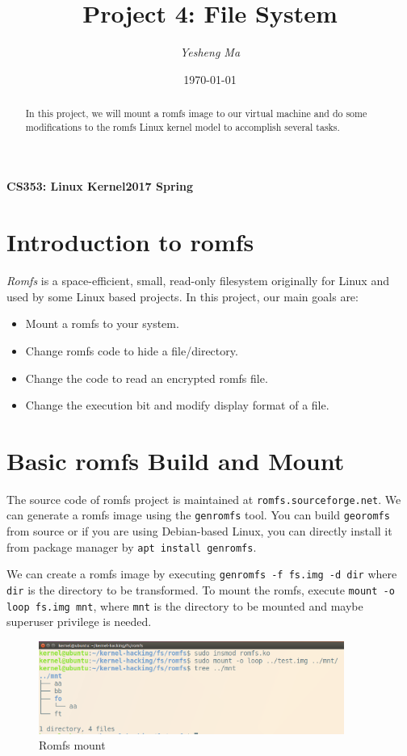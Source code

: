 \documentclass{article}
\begin{document}
\title{Project 4: File System}
\author{\textit{Yesheng Ma}}
\date{\today}
{\bf\small CS353: Linux Kernel}\hfill{\bf\small 2017 Spring}
{\let\newpage\relax\maketitle}
\maketitle


\begin{abstract}
In this project, we will mount a romfs image to our virtual machine and do some modifications to the romfs Linux kernel model to accomplish several tasks.
\end{abstract}

\section{Introduction to romfs}
\emph{Romfs} is a space-efficient, small, read-only filesystem originally for Linux and used by some Linux based projects. In this project, our main goals are:
\begin{itemize}
\item Mount a romfs to your system.
\item Change romfs code to hide a file/directory.
\item Change the code to read an encrypted romfs file.
\item Change the execution bit and modify display format of a file.
\end{itemize}

\section{Basic romfs Build and Mount}
The source code of romfs project is maintained at \texttt{romfs.sourceforge.net}. We can generate a romfs image using the \texttt{genromfs} tool. You can build \texttt{georomfs} from source or if you are using Debian-based Linux, you can directly install it from package manager by \texttt{apt install genromfs}.

We can create a romfs image by executing \texttt{genromfs -f fs.img -d dir} where \texttt{dir} is the directory to be transformed. To mount the romfs, execute \texttt{mount -o loop fs.img mnt}, where \texttt{mnt} is the directory to be mounted and maybe superuser privilege is needed.

\begin{figure}[H]
\centering
\includegraphics[width=10cm]{basic.png}
\caption{Romfs mount}
\end{figure}
\end{document}
